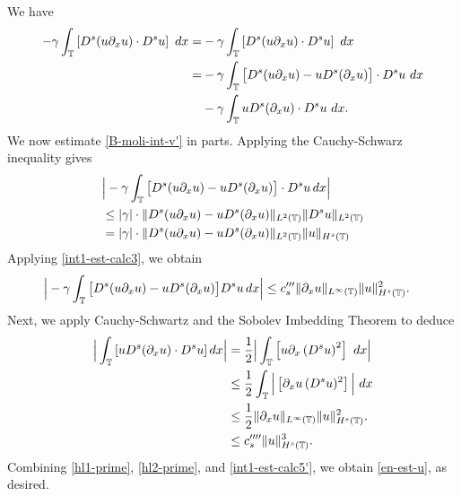 	We have
	\begin{equation} 
	\begin{split}
		\label{B-moli-int-v'}
		-  \gamma \int_{\mathbb{T}} \left [D^s (u \partial_x u) \cdot D^s
		u \right ] \ dx
		= &- \gamma  \int_{\mathbb{T}}
		\left [ D^s(u \partial_x u) \cdot   D^s u \right ] \ dx
		\\
		=& - \gamma \int_{\mathbb{T}}
		\big[ 
		D^s(u\partial_x u)  -  u D^s (\partial_xu)
		\big] \cdot
		D^s u   \ dx
		\\
		&
		- \gamma \int_{\mathbb{T}}
		u D^s (\partial_xu) \cdot
		D^su \ dx.
	\end{split}
\end{equation}
%
%
%
We now estimate \eqref{B-moli-int-v'} in parts. Applying the Cauchy-Schwarz inequality gives
%
\begin{equation*} 
	\begin{split}
		& \Big|
		- \gamma \int_{\mathbb{T}}
		\big[ 
		D^s(u\partial_x u)  -  u D^s (\partial_xu)
		\big] \cdot
		D^s u   \, dx
		\Big|
		\\
		& \le
		|\gamma| \cdot \|
		D^s(u\partial_x u)  -  u D^s (\partial_xu)
		\|_{L^2(\mathbb{T})}
		\|
		D^s u 
		\|_{L^2(\mathbb{T})}
		\\
		& =
		|\gamma| \cdot \| D^s(u\partial_x u)  -  u D^s (\partial_xu)
		\|_{L^2(\mathbb{T})}
		\|
		u
		\|_{H^s(\mathbb{T})}
			\end{split}
\end{equation*}
Applying \eqref{int1-est-calc3}, we obtain
\begin{equation*}
\begin{split}
		\Big|
		- \gamma \int_{\mathbb{T}}
		\big[ 
		D^s(u\partial_x u)  -  u D^s (\partial_xu)
		\big]
		D^s u   \, dx
		\Big|
		&\le
		 c_s'''   \| \partial_x u \|_{L^\infty(\mathbb{T})} 
		\| u \|_{H^s(\mathbb{T})}^2.
	\end{split}
\end{equation*}
%
Next, we apply Cauchy-Schwartz and the Sobolev Imbedding Theorem to deduce 
	\begin{equation} 
		\label{int1-est-calc5'}
		\begin{split}
			\Big|
			\int_{\mathbb{T}}
			\left [u D^s (\partial_x u)
			\cdot  D^s u \right ] dx
			\Big|
			& =
			\frac{1}{2} \Big|
			   \int_{\mathbb{T}}
			\left [u \partial_x\left(D^s u\right)^2 \right ] \ dx
			\Big|
			\\
			& \le
			\frac{1}{2} \int_{\mathbb{T}} \Big |
			\left [\partial_x u \, (D^s u)^2  \right ] 
			\Big| \ dx
			\\
			& \le
			\frac{1}{2}
			\| \partial_x u \|_{L^\infty(\mathbb{T})} 
			\| u \|_{H^s(\mathbb{T})}^2.
			\\
			& \le c_s'''' \|u\|_{H^s(\mathbb{T})}^3.
		\end{split}
	\end{equation}
	Combining \eqref{hl1-prime}, \eqref{hl2-prime},
	and \eqref{int1-est-calc5'}, we obtain \eqref{en-est-u}, as desired.
